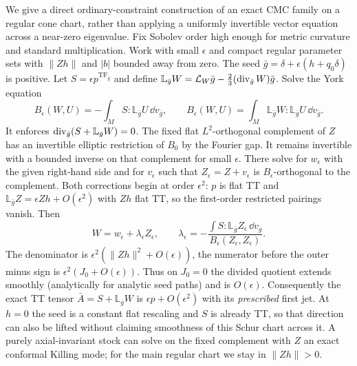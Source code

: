 We give a direct ordinary-constraint construction of an exact CMC family on a regular cone chart, rather than applying a uniformly invertible vector equation across a near-zero eigenvalue. Fix Sobolev order high enough for metric curvature and standard multiplication. Work with small \(\epsilon\) and compact regular parameter sets with \(\|Zh\|\) and \(|b|\) bounded away from zero. The seed
\(\bar g=\delta+\epsilon(h+q_0\delta)\) is positive. Let \(S=\epsilon p^{\mathrm{TF}_{\bar g}}\) and define
\(\mathbb L_{\bar g}W=\mathcal L_W\bar g-\tfrac23(\operatorname{div}_{\bar g}W)\bar g\).
Solve the York equation
\[
      B_\epsilon(W,U)=-\int_M S:\mathbb L_{\bar g}U\,\dd v_{\bar g},
       \qquad
      B_\epsilon(W,U)=\int_M\mathbb L_{\bar g}W:
                                    \mathbb L_{\bar g}U\,\dd v_{\bar g}.
\]
It enforces \(\operatorname{div}_{\bar g}(S+\mathbb L_{\bar g}W)=0\). The fixed flat \(L^2\)-orthogonal complement of \(Z\) has an invertible elliptic restriction of \(B_0\) by the Fourier gap. It remains invertible with a bounded inverse on that complement for small \(\epsilon\). There solve for \(w_\epsilon\) with the given right-hand side and for \(v_\epsilon\) such that \(Z_\epsilon=Z+v_\epsilon\) is \(B_\epsilon\)-orthogonal to the complement. Both corrections begin at order \(\epsilon^2\): \(p\) is flat TT and \(\mathbb L_{\bar g}Z=\epsilon Zh+O(\epsilon^2)\) with \(Zh\) flat TT, so the first-order restricted pairings vanish. Then
\[
 W=w_\epsilon+\lambda_\epsilon Z_\epsilon,\qquad
 \lambda_\epsilon=-\frac{\int S:\mathbb L_{\bar g} Z_\epsilon\,\dd v_{\bar g}}
                           {B_\epsilon(Z_\epsilon,Z_\epsilon)} .
\]
The denominator is \(\epsilon^2(\|Zh\|^2+O(\epsilon))\), the numerator before the outer minus sign is \(\epsilon^2(J_0+O(\epsilon))\). Thus on \(J_0=0\) the divided quotient extends smoothly (analytically for analytic seed paths) and is \(O(\epsilon)\). Consequently the exact TT tensor \(\bar A=S+\mathbb L_{\bar g}W\) is \(\epsilon p+O(\epsilon^2)\) with its \emph{prescribed} first jet. At \(h=0\) the seed is a constant flat rescaling and \(S\) is already TT, so that direction can also be lifted without claiming smoothness of this Schur chart across it. A purely axial-invariant stock can solve on the fixed complement with \(Z\) an exact conformal Killing mode; for the main regular chart we stay in \(\|Zh\|>0\).

